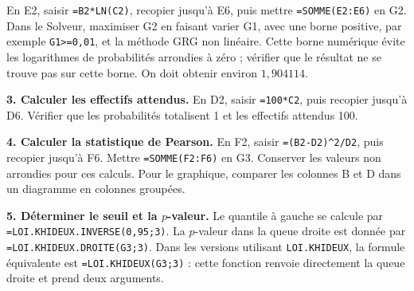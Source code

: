 {{\begin{minipage}{\linewidth}
En E2, saisir \texttt{=B2*LN(C2)}, recopier jusqu'à E6, puis mettre \texttt{=SOMME(E2:E6)} en G2. Dans le Solveur, maximiser G2 en faisant varier G1, avec une borne positive, par exemple \texttt{G1>=0,01}, et la méthode GRG non linéaire. Cette borne numérique évite les logarithmes de probabilités arrondies à zéro ; vérifier que le résultat ne se trouve pas sur cette borne. On doit obtenir environ $1{,}904114$.
\end{minipage}\par\smallskip
\begin{minipage}{\linewidth}
\textbf{3. Calculer les effectifs attendus.} En D2, saisir \texttt{=100*C2}, puis recopier jusqu'à D6. Vérifier que les probabilités totalisent 1 et les effectifs attendus 100.
\end{minipage}\par\smallskip
\begin{minipage}{\linewidth}
\textbf{4. Calculer la statistique de Pearson.} En F2, saisir \texttt{=(B2-D2)\^{}2/D2}, puis recopier jusqu'à F6. Mettre \texttt{=SOMME(F2:F6)} en G3. Conserver les valeurs non arrondies pour ces calculs. Pour le graphique, comparer les colonnes B et D dans un diagramme en colonnes groupées.
\end{minipage}\par\smallskip
\begin{minipage}{\linewidth}
\textbf{5. Déterminer le seuil et la $p$-valeur.} Le quantile à gauche se calcule par \texttt{=LOI.KHIDEUX.INVERSE(0,95;3)}. La $p$-valeur dans la queue droite est donnée par \texttt{=LOI.KHIDEUX.DROITE(G3;3)}. Dans les versions utilisant \texttt{LOI.KHIDEUX}, la formule équivalente est \texttt{=LOI.KHIDEUX(G3;3)} : cette fonction renvoie directement la queue droite et prend deux arguments.
\end{minipage}
}
}

